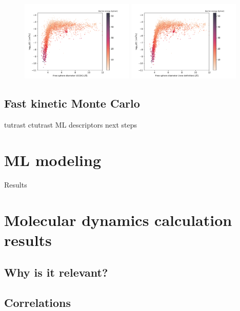 \documentclass[main]{subfiles}
\begin{document}
\begin{figure}[ht]
  \centering
    \includegraphics[width=0.48\textwidth]{figures/5-diffusion/difflog_Df-ccdc_barrier.pdf}
    \includegraphics[width=0.48\textwidth]{figures/5-diffusion/difflog_Df-uff298K_barrier.pdf}
    \caption{}
    \label{fgr:}
\end{figure}

\subsection{Fast kinetic Monte Carlo}
tutrast
ctutrast\cite{Mace_2019}
ML descriptors
next steps

\section{ML modeling}

Results

\section{Molecular dynamics calculation results}

\subsection{Why is it relevant?}

\subsection{Correlations}
\end{document}
